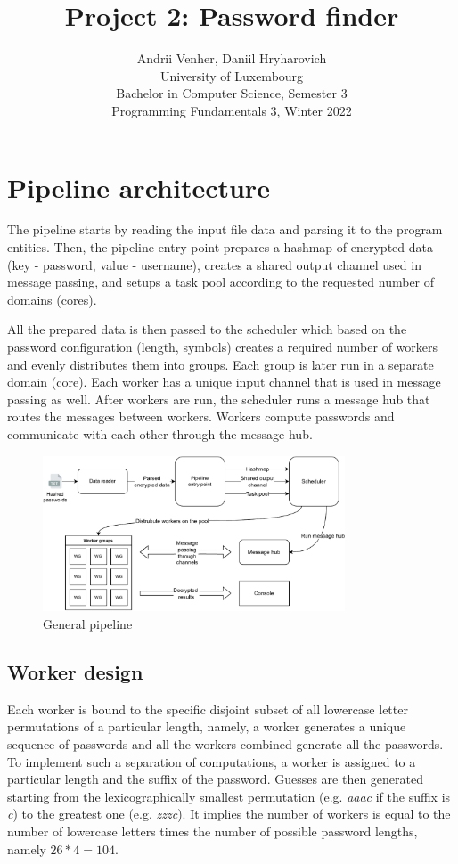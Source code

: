 \documentclass{article}
\title{Project 2: Password finder}
\author{Andrii Venher, Daniil Hryharovich\\
  \small University of Luxembourg\\
  \small Bachelor in Computer Science, Semester 3\\
  \small Programming Fundamentals 3, Winter 2022
}
\date{}
\begin{document}
\maketitle

\section{Pipeline architecture}

The pipeline starts by reading the input file data and parsing it to the program entities. Then, the pipeline entry point prepares a hashmap of encrypted data (key - password, value - username), creates a shared output channel used in message passing, and setups a task pool according to the requested number of domains (cores).
 
All the prepared data is then passed to the scheduler which based on the password configuration (length, symbols) creates a required number of workers and evenly distributes them into groups. Each group is later run in a separate domain (core). Each worker has a unique input channel that is used in message passing as well. After workers are run, the scheduler runs a message hub that routes the messages between workers. Workers compute passwords and communicate with each other through the message hub. 

\begin{figure}[h]
  \caption{General pipeline}
  \vspace{0.2in}
  \centering
  \includegraphics[width=0.8\textwidth]{resources/general_pipeline.pdf}
\end{figure}

\subsection{Worker design}

Each worker is bound to the specific disjoint subset of all lowercase letter permutations of a particular length, namely, a worker generates a unique sequence of passwords and all the workers combined generate all the passwords. To implement such a separation of computations, a worker is assigned to a particular length and the suffix of the password. Guesses are then generated starting from the lexicographically smallest permutation (e.g. \emph{aaac} if the suffix is \emph{c}) to the greatest one (e.g. \emph{zzzc}). It implies the number of workers is equal to the number of lowercase letters times the number of possible password lengths, namely $ 26 * 4 = 104 $.
\end{document}

